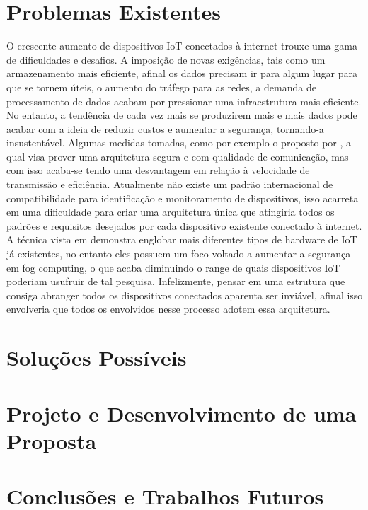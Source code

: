 \documentclass[article]{abntex2}
\begin{document}
\section{Problemas Existentes}
O crescente aumento de dispositivos IoT conectados à internet trouxe uma gama de dificuldades e desafios. A imposição de novas exigências, tais como um armazenamento mais eficiente, afinal os dados precisam ir para algum lugar para que se tornem úteis, o aumento do tráfego para as redes, a demanda de processamento de dados acabam por pressionar uma infraestrutura mais eficiente. No entanto, a tendência de cada vez mais se produzirem mais e mais dados pode acabar com a ideia de reduzir custos e aumentar a segurança, tornando-a insustentável. Algumas medidas tomadas, como por exemplo o proposto por  \cite{Stergiou:2017}, a qual visa prover uma arquitetura segura e com qualidade de comunicação, mas com isso acaba-se tendo uma desvantagem em relação à velocidade de transmissão e eficiência.
\newline
Atualmente não existe um padrão internacional de compatibilidade para identificação e monitoramento de dispositivos, isso acarreta em uma dificuldade para criar uma arquitetura única que atingiria todos os padrões e requisitos desejados por cada dispositivo existente conectado à internet. A técnica vista em \cite{Li:2019} demonstra englobar mais diferentes tipos de hardware de IoT já existentes, no entanto eles possuem um foco voltado a aumentar a segurança em fog computing, o que acaba diminuindo o range de quais dispositivos IoT poderiam usufruir de tal pesquisa. Infelizmente, pensar em uma estrutura que consiga abranger todos os dispositivos conectados aparenta ser inviável, afinal isso envolveria que todos os envolvidos nesse processo adotem essa arquitetura.

\section{Soluções Possíveis}
\section{Projeto e Desenvolvimento de uma Proposta}
\section{Conclusões e Trabalhos Futuros}
\end{document}
